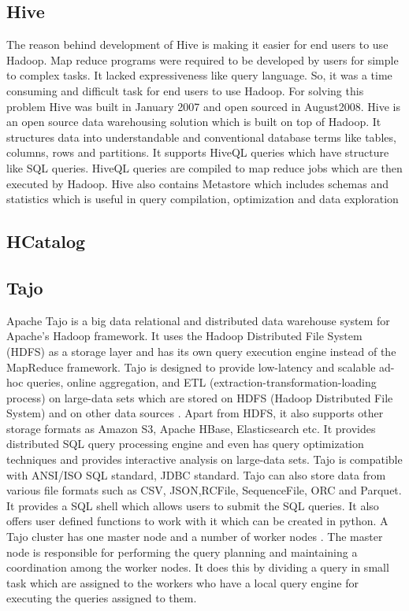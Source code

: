 \subsection{ Hive}
     
     The reason behind development of Hive is making it easier for end
     users to use Hadoop. Map reduce programs were required to be
     developed by users for simple to complex tasks. It lacked
     expressiveness like query language. So, it was a time consuming
     and difficult task for end users to use Hadoop. For solving this
     problem Hive was built in January 2007 and open sourced in
     August2008.  Hive is an open source data warehousing solution
     which is built on top of Hadoop. It structures data into
     understandable and conventional database terms like tables,
     columns, rows and partitions. It supports HiveQL queries which
     have structure like SQL queries. HiveQL queries are compiled to
     map reduce jobs which are then executed by Hadoop.  Hive also
     contains Metastore which includes schemas and statistics which is
     useful in query compilation, optimization and data exploration
     \cite{www-hive}

\subsection{ HCatalog}
\subsection{ Tajo}

     Apache Tajo \cite{www-apache-tajo} is a big data relational and
     distributed data warehouse system for Apache's Hadoop
     framework. It uses the Hadoop Distributed File System (HDFS) as a
     storage layer and has its own query execution engine instead of
     the MapReduce framework. Tajo is designed to provide low-latency
     and scalable ad-hoc queries, online aggregation, and ETL
     (extraction-transformation-loading process) on large-data sets
     which are stored on HDFS (Hadoop Distributed File System) and on
     other data sources \cite{www-tutorialspoint-tajo}. Apart from HDFS,
     it also supports other storage formats as Amazon S3, Apache
     HBase, Elasticsearch etc. It provides distributed SQL query
     processing engine and even has query optimization techniques and
     provides interactive analysis on large-data sets. Tajo is
     compatible with ANSI/ISO SQL standard, JDBC standard. Tajo can
     also store data from various file formats such as CSV,
     JSON,RCFile, SequenceFile, ORC and Parquet. It provides a SQL
     shell which allows users to submit the SQL queries. It also
     offers user defined functions to work with it which can be
     created in python. A Tajo cluster has one master node and a
     number of worker nodes \cite{www-tutorialspoint-tajo}. The master
     node is responsible for performing the query planning and
     maintaining a coordination among the worker nodes. It does this
     by dividing a query in small task which are assigned to the
     workers who have a local query engine for executing the queries
     assigned to them.
     

